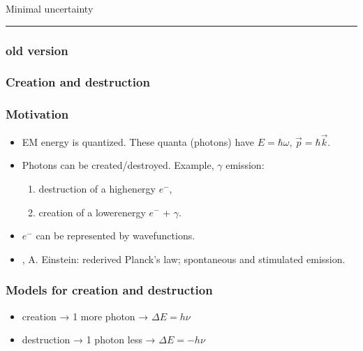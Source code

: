 \documentclass[letterpaper,10pt,english]{jupyterBook}
\begin{document}
\sphinxAtStartPar
Minimal uncertainty


\bigskip\hrule\bigskip

\subsubsection*{old version}
\subsubsection*{Creation and destruction}
\subsubsection*{Motivation}
\begin{itemize}
\item {} 
\sphinxAtStartPar
EM energy is quantized. These quanta (photons) have \(E=\hbar\omega\), \(\vec p=\hbar\vec k\).

\item {} 
\sphinxAtStartPar
Photons can be created/destroyed. Example, \(\gamma\) emission:
\begin{enumerate}
%
\item {} 
\sphinxAtStartPar
destruction of a high\sphinxhyphen{}energy \(e^-\),

\item {} 
\sphinxAtStartPar
creation of a lower\sphinxhyphen{}energy \(e^-\) + \(\gamma\).

\end{enumerate}

\item {} 
\sphinxAtStartPar
\(e^-\) can be represented by wavefunctions.

\item {} 
, A. Einstein: re\sphinxhyphen{}derived Planck’s law; spontaneous and stimulated emission.

\end{itemize}
\subsubsection*{Models for creation and destruction}

\sphinxAtStartPar
{}
\begin{itemize}
\item {} 
\sphinxAtStartPar
creation → 1 more photon → \(\Delta E = h\nu\)

\item {} 
\sphinxAtStartPar
destruction → 1 photon less → \(\Delta E = -h\nu\)

\end{itemize}
\end{document}
